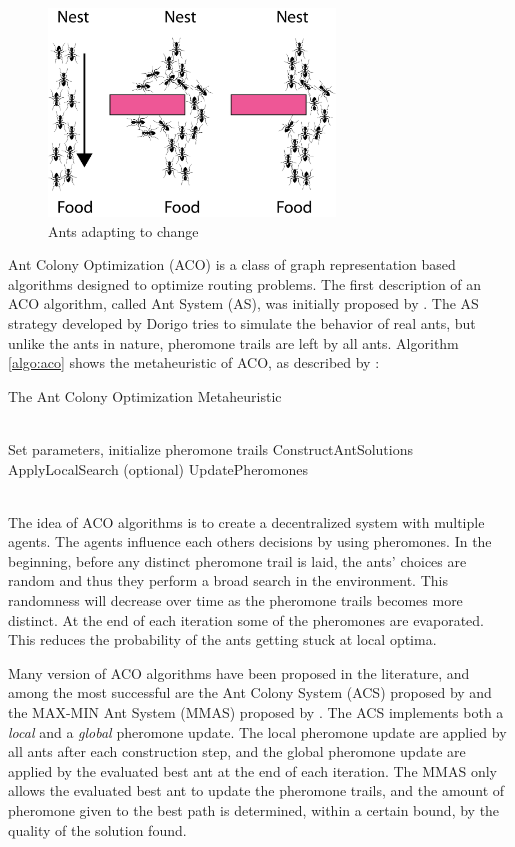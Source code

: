 \begin{figure}[H]
  \centering
  \includegraphics[width=3in]{assets/maur.png}
  \caption{Ants adapting to change}
   \label{fig:ants}
\end{figure}

Ant Colony Optimization (ACO) is a class of graph representation based algorithms designed to optimize routing problems. The first description of an ACO algorithm, called Ant System (AS), was initially proposed by \citet{dorigo96}. The AS strategy developed by Dorigo tries to simulate the behavior of real ants, but unlike the ants in nature, pheromone trails are left by all ants. Algorithm \ref{algo:aco} shows the metaheuristic of ACO, as described by \citet{dorigo06}: \\
\begin{algorithm}[H]
\caption{The Ant Colony Optimization Metaheuristic}
\label{algo:aco}
\begin{algorithmic}
\\ Set parameters, initialize pheromone trails
    \State ConstructAntSolutions
    \State ApplyLocalSearch (optional)
    \State UpdatePheromones
  \EndWhile
\end{algorithmic}
\end{algorithm}
~\\

The idea of ACO algorithms is to create a decentralized system with multiple agents. The agents influence each others decisions by using pheromones. In the beginning, before any distinct pheromone trail is laid, the ants' choices are random and thus they perform a broad search in the environment. This randomness will decrease over time as the pheromone trails becomes more distinct. At the end of each iteration some of the pheromones are evaporated. This reduces the probability of the ants getting stuck at local optima. 

Many version of ACO algorithms have been proposed in the literature, and among the most successful are the Ant Colony System (ACS) proposed by \citet{dorigo97} and the MAX-MIN Ant System (MMAS) proposed by \citet{stutzle06}. The ACS implements both a \textit{local} and a \textit{global} pheromone update. The local pheromone update are applied by all ants after each construction step, and the global pheromone update are applied by the evaluated best ant at the end of each iteration. The MMAS only allows the evaluated best ant to update the pheromone trails, and the amount of pheromone given to the best path is determined, within a certain bound, by the quality of the solution found. 

